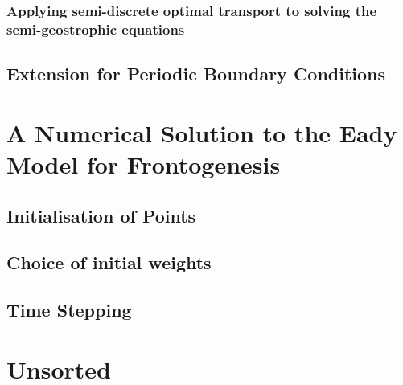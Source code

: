 \subsection{Applying semi-discrete optimal transport to solving the semi-geostrophic equations}
\section{Extension for Periodic Boundary Conditions}

\chapter{A Numerical Solution to the Eady Model for Frontogenesis \label{algorithm}}
\section{Initialisation of Points}
\section{Choice of initial weights}
\section{Time Stepping}
\chapter{Unsorted}
